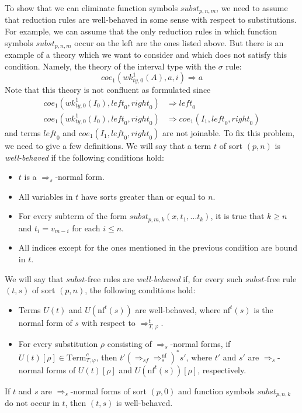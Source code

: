 \documentclass[reqno]{amsart}
\theoremstyle{definition}
\theoremstyle{remark}
\newcommand{\nf}{\mathrm{nf}}
\newcommand{\Term}{\mathrm{Term}}
\newcommand{\leftI}{\mathit{left}}
\newcommand{\rightI}{\mathit{right}}
\newcommand{\coe}{\mathit{coe}}
\newcommand{\subst}{\mathit{subst}}
\newcommand{\wk}{\mathit{wk}}
\newcommand{\ty}{\mathit{ty}}
\numberwithin{figure}{section}
\begin{document}
To show that we can eliminate function symbols $\subst_{p,n,m}$, we need to assume that reduction rules are well-behaved in some sense with respect to substitutions.
For example, we can assume that the only reduction rules in which function symbols $\subst_{p,n,m}$ occur on the left are the ones listed above.
But there is an example of a theory which we want to consider and which does not satisfy this condition.
Namely, the theory of the interval type with the $\sigma$ rule:
\[ \coe_1(\wk^1_{\ty,0}(A), a, i) \Rightarrow a \]
Note that this theory is not confluent as formulated since
\begin{align*}
\coe_1(\wk^1_{\ty,0}(I_0), \leftI_0, \rightI_0) & \Rightarrow \leftI_0 \\
\coe_1(\wk^1_{\ty,0}(I_0), \leftI_0, \rightI_0) & \Rightarrow \coe_1(I_1, \leftI_0, \rightI_0)
\end{align*}
and terms $\leftI_0$ and $\coe_1(I_1, \leftI_0, \rightI_0)$ are not joinable.
To fix this problem, we need to give a few definitions.
We will say that a term $t$ of sort $(p,n)$ is \emph{well-behaved} if the following conditions hold:
\begin{itemize}
\item $t$ is a $\Rightarrow_s$-normal form.
\item All variables in $t$ have sorts greater than or equal to $n$.
\item For every subterm of the form $\subst_{p,m,k}(x, t_1, \ldots t_k)$, it is true that $k \geq n$ and $t_i = v_{m-i}$ for each $i \leq n$.
\item All indices except for the ones mentioned in the previous condition are bound in $t$.
\end{itemize}
We will say that $\subst$-free rules are \emph{well-behaved} if, for every such $\subst$-free rule $(t,s)$ of sort $(p,n)$, the following conditions hold:
\begin{itemize}
\item Terms $U(t)$ and $U(\nf^t(s))$ are well-behaved, where $\nf^t(s)$ is the normal form of $s$ with respect to $\Rightarrow_{T,\varphi}^t$.
\item For every substitution $\rho$ consisting of $\Rightarrow_s$-normal forms, if $U(t)[\rho] \in \Term_{T,\varphi}^c$, then $t' (\Rightarrow_{sf} \Rightarrow_s^\nf)^* s'$,
where $t'$ and $s'$ are $\Rightarrow_s$-normal forms of $U(t)[\rho]$ and $U(\nf^t(s))[\rho]$, respectively.
\end{itemize}

\begin{example}
If $t$ and $s$ are $\Rightarrow_s$-normal forms of sort $(p,0)$ and function symbols $\subst_{p,n,k}$ do not occur in $t$, then $(t,s)$ is well-behaved.
\end{example}
\end{document}
